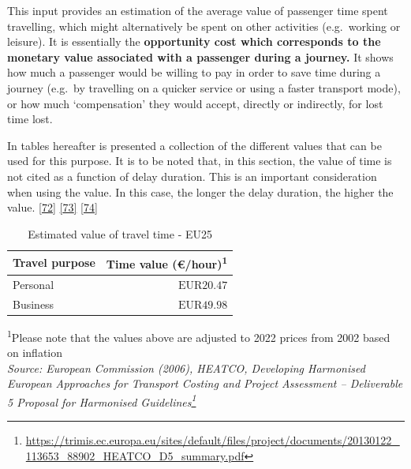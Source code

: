 \documentclass[
  11pt,
  a4paper,
]{book}
\DeclareRobustCommand{\href}[2]{#2\footnote{\url{#1}}}
\begin{document}
This input provides an estimation of the average value of passenger time
spent travelling, which might alternatively be spent on other activities
(e.g.~working or leisure). It is essentially the \textbf{opportunity
cost which corresponds to the monetary value associated with a passenger
during a journey.} It shows how much a passenger would be willing to pay
in order to save time during a journey (e.g.~by travelling on a quicker
service or using a faster transport mode), or how much `compensation'
they would accept, directly or indirectly, for lost time lost.

In tables hereafter is presented a collection of the different values
that can be used for this purpose. It is to be noted that, in this
section, the value of time is not cited as a function of delay duration.
This is an important consideration when using the value. In this case,
the longer the delay duration, the higher the value.
\protect\hyperlink{ref-heatco2006}{{[}72{]}}
\protect\hyperlink{ref-frminecotra2019}{{[}73{]}}
\protect\hyperlink{ref-aptcom2014}{{[}74{]}}

\hypertarget{tbl-pas-time-value-eu}{}
\setlength{\LTpost}{0mm}
\begin{longtable}{lr}
\caption{\label{tbl-pas-time-value-eu}Estimated value of travel time - EU25 }\tabularnewline

\toprule
Travel purpose & Time value (€/hour)\textsuperscript{1} \\ 
\midrule
Personal & $\text{EUR}20.47$ \\ 
Business & $\text{EUR}49.98$ \\ 
\bottomrule
\end{longtable}
\begin{minipage}{\linewidth}
\textsuperscript{1}Please note that the values above are adjusted to 2022 prices from 2002 based on inflation\\
\emph{Source: \href{https://trimis.ec.europa.eu/sites/default/files/project/documents/20130122_113653_88902_HEATCO_D5_summary.pdf}{European Commission (2006), HEATCO, Developing Harmonised European Approaches for Transport Costing and Project Assessment -- Deliverable 5 Proposal for Harmonised Guidelines}}\\
\end{minipage}
\end{document}
